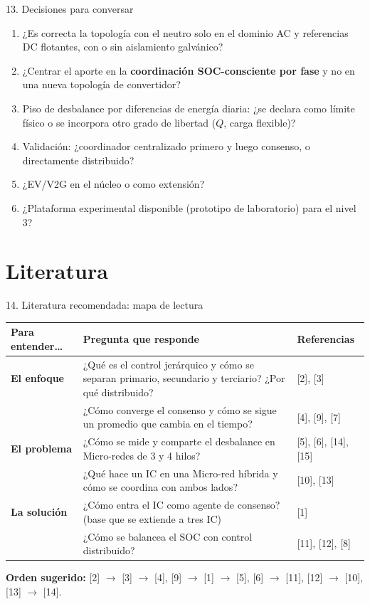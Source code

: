 \documentclass[aspectratio=169,11pt]{beamer}
\begin{document}
\begin{frame}{13. Decisiones para conversar}
  \begin{enumerate}\setlength\itemsep{5pt}
    \item ¿Es correcta la topología con el neutro solo en el dominio AC y referencias DC flotantes, con o sin aislamiento galvánico?
    \item ¿Centrar el aporte en la \textbf{coordinación SOC-consciente por fase} y no en una nueva topología de convertidor?
    \item Piso de desbalance por diferencias de energía diaria: ¿se declara como límite físico o se incorpora otro grado de libertad ($Q$, carga flexible)?
    \item Validación: ¿coordinador centralizado primero y luego consenso, o directamente distribuido?
    \item ¿EV/V2G en el núcleo o como extensión?
    \item ¿Plataforma experimental disponible (prototipo de laboratorio) para el nivel 3?
  \end{enumerate}
\end{frame}

\section{Literatura}
\begin{frame}{14. Literatura recomendada: mapa de lectura}
  \footnotesize\renewcommand{\arraystretch}{1.25}
  \begin{tabularx}{\textwidth}{@{}p{3.0cm}X p{2.6cm}@{}}
    \toprule
    Para entender\ldots & Pregunta que responde & Referencias \\ \midrule
    \textbf{El enfoque} & ¿Qué es el control jerárquico y cómo se separan primario, secundario y terciario? ¿Por qué distribuido? & [2], [3] \\
    & ¿Cómo converge el consenso y cómo se sigue un promedio que cambia en el tiempo? & [4], [9], [7] \\
    \textbf{El problema} & ¿Cómo se mide y comparte el desbalance en Micro-redes de 3 y 4 hilos? & [5], [6], [14], [15] \\
    & ¿Qué hace un IC en una Micro-red híbrida y cómo se coordina con ambos lados? & [10], [13] \\
    \textbf{La solución} & ¿Cómo entra el IC como agente de consenso? (base que se extiende a tres IC) & [1] \\
    & ¿Cómo se balancea el SOC con control distribuido? & [11], [12], [8] \\ \bottomrule
  \end{tabularx}

  \vspace{8pt}
  \textbf{Orden sugerido:} [2] $\to$ [3] $\to$ [4], [9] $\to$ [1] $\to$ [5], [6] $\to$ [11], [12] $\to$ [10], [13] $\to$ [14].
\end{frame}
\end{document}
